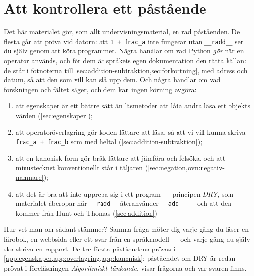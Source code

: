 \chapter{Att kontrollera ett påstående}
\label{app:verifiera-operatorer}

Det här materialet gör, som allt undervisningsmaterial, en rad
påståenden.  De flesta går att pröva vid datorn: att
\texttt{1 + frac_a} inte fungerar utan
\texttt{__radd__} ser du själv genom att köra programmet.
Några handlar om vad Python \emph{gör} när en operator används, och för
dem är språkets egen dokumentation den rätta källan: de står i
fotnoterna till \cref{sec:addition-subtraktion,sec:forkortning}, med
adress och datum, så att den som vill kan slå upp dem.  Och några
handlar om vad forskningen och fältet säger, och dem kan ingen körning
avgöra:
\begin{enumerate}
  \item att egenskaper är ett bättre sätt än läsmetoder att låta andra
    läsa ett objekts värden (\cref{sec:egenskaper});
  \item att operatoröverlagring gör koden lättare att läsa, så att vi
    vill kunna skriva \texttt{frac_a + frac_b} som med
    heltal (\cref{sec:addition-subtraktion});
  \item att en kanonisk form gör bråk lättare att jämföra och felsöka,
    och att minustecknet konventionellt står i täljaren
    (\cref{sec:negation,ovn:negativ-namnare});
  \item att det är bra att inte upprepa sig i ett program --- principen
    \emph{DRY}, som materialet åberopar när
    \texttt{__radd__} återanvänder
    \texttt{__add__} --- och att den kommer från Hunt och
    Thomas (\cref{sec:addition})
\end{enumerate}
Hur vet man om sådant stämmer?  Samma fråga möter dig varje gång du läser
en lärobok, en webbsida eller ett svar från en språkmodell --- och varje
gång du själv ska skriva en rapport.  De tre första påståendena prövas
i \cref{app:egenskaper,app:overlagring,app:kanonisk}; påståendet om DRY
är redan prövat i föreläsningen \emph{Algoritmiskt
tänkande}.
 visar frågorna och var svaren finns.


